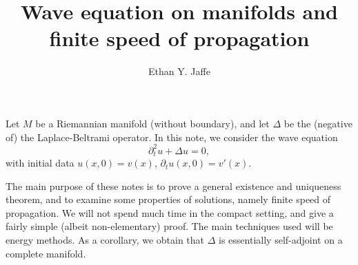 \documentclass[12pt]{article}
\title{Wave equation on manifolds and finite speed of propagation}
\author{Ethan Y. Jaffe}
\date{}
\begin{document}
\maketitle
\setcounter{section}{1}
Let $M$ be a Riemannian manifold (without boundary), and let $\Delta$ be the (negative of) the Laplace-Beltrami operator. In this note, we consider the wave equation
\[\partial_t^2 u + \Delta u = 0,\]
with initial data $u(x,0) = v(x)$, $\partial_t u(x,0) = v'(x)$. 

The main purpose of these notes is to prove a general existence and uniqueness theorem, and to examine some properties of solutions, namely finite speed of propagation. We will not spend much time in the compact setting, and give a fairly simple (albeit non-elementary) proof. The main techniques used will be energy methods. As a corollary, we obtain that $\Delta$ is essentially self-adjoint on a complete manifold.
\end{document}
